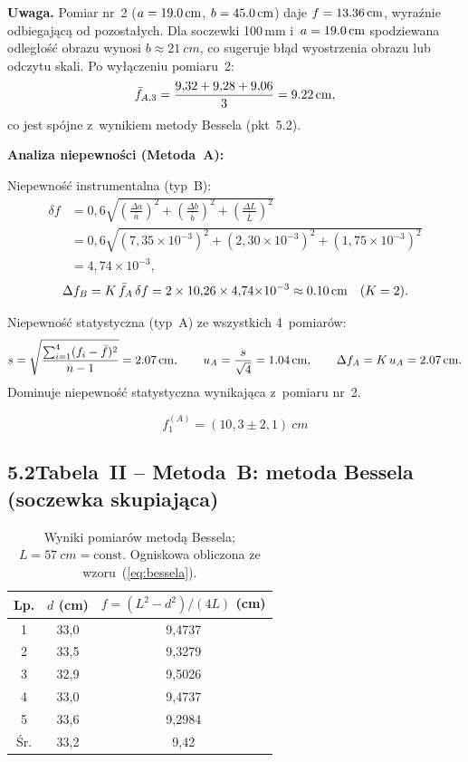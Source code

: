 \documentclass[a4paper,12pt]{article}
\begin{document}
\noindent\textbf{Uwaga.} Pomiar nr~2 ($a = \SI{19{,}0}{cm}$, $b = \SI{45{,}0}{cm}$)
daje $f = \SI{13{,}36}{cm}$, wyraźnie odbiegającą od pozostałych. Dla soczewki 100\,mm
i~$a = \SI{19{,}0}{cm}$ spodziewana odległość obrazu wynosi $b \approx \SI{21}{cm}$,
co sugeruje błąd wyostrzenia obrazu lub odczytu skali. Po wyłączeniu pomiaru~2:
\[
  \bar{f}_{A,3} = \frac{9{,}32 + 9{,}28 + 9{,}06}{3} = \SI{9{,}22}{cm},
\]
co jest spójne z~wynikiem metody Bessela (pkt~5.2).

\medskip
\noindent\textbf{Analiza niepewności (Metoda~A):}

Niepewność instrumentalna (typ~B):
\begin{align*}
  \delta f &= 0{,}6\sqrt{\left(\frac{\Delta a}{\bar{a}}\right)^2
                       + \left(\frac{\Delta b}{\bar{b}}\right)^2
                       + \left(\frac{\Delta L}{\bar{L}}\right)^2} \\
           &= 0{,}6\sqrt{(7{,}35{\times}10^{-3})^2
                       + (2{,}30{\times}10^{-3})^2
                       + (1{,}75{\times}10^{-3})^2} \\
           &= 4{,}74{\times}10^{-3},
\end{align*}
\[
  \Delta f_B = K\,\bar{f}_A\,\delta f = 2 \times 10{,}26 \times 4{,}74{\times}10^{-3}
             \approx \SI{0{,}10}{cm} \quad (K=2).
\]

Niepewność statystyczna (typ~A) ze wszystkich 4~pomiarów:
\[
  s = \sqrt{\frac{\sum_{i=1}^{4}(f_i-\bar{f})^2}{n-1}} = \SI{2{,}07}{cm},
  \qquad
  u_A = \frac{s}{\sqrt{4}} = \SI{1{,}04}{cm},
  \qquad
  \Delta f_A = K\,u_A = \SI{2{,}07}{cm}.
\]
Dominuje niepewność statystyczna wynikająca z~pomiaru nr~2.

\[
  \boxed{f_1^{(A)} = (10{,}3 \pm 2{,}1)\ \si{cm}}
\]

\subsection*{5.2\quad Tabela~II – Metoda~B: metoda Bessela (soczewka skupiająca)}

\begin{table}[H]
\centering
\caption{Wyniki pomiarów metodą Bessela; $L = \SI{57}{cm} = \text{const}$.
         Ogniskowa obliczona ze wzoru~(\ref{eq:bessela}).}
\label{tab:B}
\renewcommand{\arraystretch}{1.25}
\begin{tabular}{c S[table-format=2.1] S[table-format=1.4]}
\toprule
Lp. & {$d$ (cm)} & {$f = (L^2-d^2)/(4L)$ (cm)} \\
 & 33,0 & 9,4737 \\
2 & 33,5 & 9,3279 \\
3 & 32,9 & 9,5026 \\
4 & 33,0 & 9,4737 \\
5 & 33,6 & 9,2984 \\
\midrule
Śr. & 33,2 & 9,42 \\
\bottomrule
\end{tabular}
\end{table}
\end{document}
